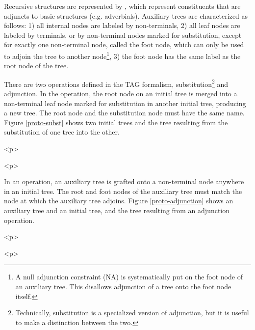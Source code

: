Recursive structures are represented by , which 
represent constituents that are adjuncts to basic structures (e.g. adverbials). 
Auxiliary trees are characterized as follows: 1) all internal nodes are labeled 
by non-terminals, 2) all leaf nodes are labeled by terminals, or by 
non-terminal nodes marked for substitution, except for exactly one non-terminal 
node, called the foot node, which can only be used to adjoin the tree to 
another node\footnote{A null adjunction constraint (NA) is systematically put on the foot node of an auxiliary tree. This disallows adjunction of a tree onto the foot node itself.}, 3) the foot node has the same label as the root node of 
the tree. 
 
There are two operations defined in the TAG formalism, 
substitution\footnote{Technically, substitution is a specialized version of adjunction, but it is useful to make a distinction between the two.} and 
adjunction.  In the  operation, the root node on an 
initial tree is merged into a non-terminal leaf node marked for substitution in 
another initial tree, producing a new tree.  The root node and the substitution 
node must have the same name.  Figure \ref{proto-subst} shows two initial trees 
and the tree resulting from the substitution of one tree into the other. 
 
\begin{rawhtml} <p> \end{rawhtml}
\centering 
{} 
\begin{rawhtml} <dl> <dt>{Substitution in TAG <p> </dl> \end{rawhtml}
\label{proto-subst} 
\begin{rawhtml} <p> \end{rawhtml}
 
In an  operation, an auxiliary tree is grafted onto a 
non-terminal node anywhere in an initial tree.  The root and foot nodes of the 
auxiliary tree must match the node at which the auxiliary tree adjoins.  Figure 
\ref{proto-adjunction} shows an auxiliary tree and an initial tree, and the 
tree resulting from an adjunction operation. 
 
\begin{rawhtml} <p> \end{rawhtml}
\centering 
{} 
\begin{rawhtml} <dl> <dt>{Adjunction in TAG <p> </dl> \end{rawhtml}
\label{proto-adjunction} 
\begin{rawhtml} <p> \end{rawhtml}
 
